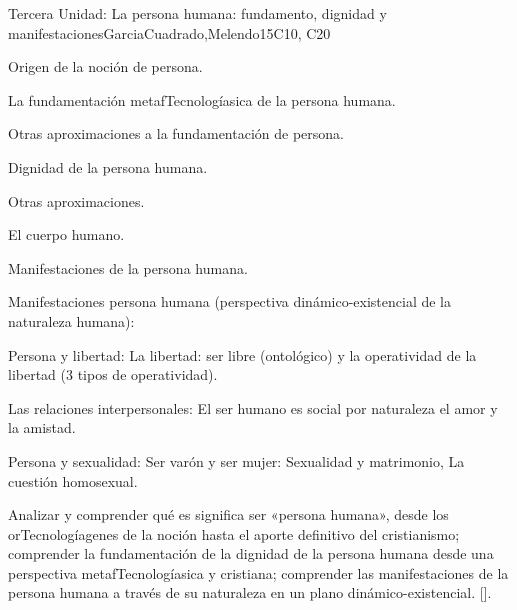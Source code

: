 \begin{syllabus}
\begin{unit}{}{Tercera Unidad: La persona humana: fundamento, dignidad y manifestaciones}{GarciaCuadrado,Melendo}{15}{C10, C20}
\begin{topics}
	\item Origen de la noción de persona.
	\item La fundamentación metafTecnologíasica de la persona humana.
	\item Otras aproximaciones a la fundamentación de persona.
	\item Dignidad de la persona humana.
		\begin{subtopics}
			\item Otras aproximaciones.
		\end{subtopics}
	\item El cuerpo humano.
	\item Manifestaciones de la persona humana.
	\item Manifestaciones persona humana (perspectiva dinámico-existencial de la naturaleza humana):
		\begin{subtopics}
			\item Persona y libertad:  La libertad: ser libre (ontológico) y la operatividad de la libertad (3 tipos de operatividad).
			\item Las relaciones interpersonales: El ser humano es social por naturaleza el amor y la amistad.
			\item Persona y sexualidad: Ser varón y ser mujer: Sexualidad y matrimonio, La cuestión homosexual.
		\end{subtopics}
\end{topics}
\begin{learningoutcomes}
	\item Analizar y comprender qué es significa ser «persona humana», desde los orTecnologíagenes de la noción hasta el aporte definitivo del cristianismo; comprender la fundamentación de la dignidad de la persona humana desde una perspectiva metafTecnologíasica y cristiana; comprender las manifestaciones de la persona humana a través de su naturaleza en un plano dinámico-existencial. [\Usage].
\end{learningoutcomes}
\end{unit}


\end{syllabus}
